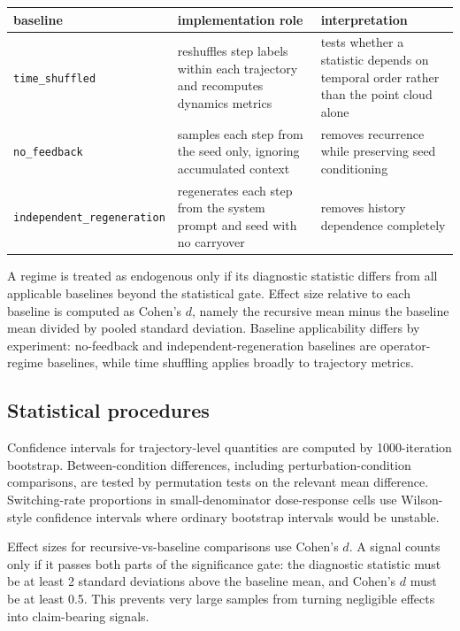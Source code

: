 \documentclass{article}
\theoremstyle{plain}
\theoremstyle{definition}
\begin{document}
\begin{table}[h!]
\centering
\small
\begin{tabularx}{\textwidth}{lYY}
\toprule
baseline & implementation role & interpretation \\
\midrule
\texttt{time\_shuffled} & reshuffles step labels within each trajectory and recomputes dynamics metrics & tests whether a statistic depends on temporal order rather than the point cloud alone \\
\texttt{no\_feedback} & samples each step from the seed only, ignoring accumulated context & removes recurrence while preserving seed conditioning \\
\texttt{independent\_regeneration} & regenerates each step from the system prompt and seed with no carryover & removes history dependence completely \\
\bottomrule
\end{tabularx}
\end{table}

A regime is treated as endogenous only if its diagnostic statistic differs from all applicable baselines beyond the statistical gate. Effect size relative to each baseline is computed as Cohen's \(d\), namely the recursive mean minus the baseline mean divided by pooled standard deviation. Baseline applicability differs by experiment: no-feedback and independent-regeneration baselines are operator-regime baselines, while time shuffling applies broadly to trajectory metrics.

\subsection{Statistical procedures}

Confidence intervals for trajectory-level quantities are computed by 1000-iteration bootstrap. Between-condition differences, including perturbation-condition comparisons, are tested by permutation tests on the relevant mean difference. Switching-rate proportions in small-denominator dose-response cells use Wilson-style confidence intervals where ordinary bootstrap intervals would be unstable.

Effect sizes for recursive-vs-baseline comparisons use Cohen's \(d\). A signal counts only if it passes both parts of the significance gate: the diagnostic statistic must be at least 2 standard deviations above the baseline mean, and Cohen's \(d\) must be at least 0.5. This prevents very large samples from turning negligible effects into claim-bearing signals.
\end{document}
